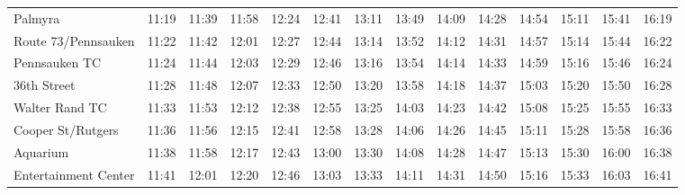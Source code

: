 \begin{center}
\begin{tabular}{@{}lrrrrrrrrrrrrr@{}}
Palmyra & 11:19 & 11:39 & 11:58 & 12:24 & 12:41 & 13:11 & 13:49 & 14:09 & 14:28 & 14:54 & 15:11 & 15:41 & 16:19 \\
Route 73/Pennsauken & 11:22 & 11:42 & 12:01 & 12:27 & 12:44 & 13:14 & 13:52 & 14:12 & 14:31 & 14:57 & 15:14 & 15:44 & 16:22 \\
Pennsauken TC & 11:24 & 11:44 & 12:03 & 12:29 & 12:46 & 13:16 & 13:54 & 14:14 & 14:33 & 14:59 & 15:16 & 15:46 & 16:24 \\
36th Street & 11:28 & 11:48 & 12:07 & 12:33 & 12:50 & 13:20 & 13:58 & 14:18 & 14:37 & 15:03 & 15:20 & 15:50 & 16:28 \\
Walter Rand TC & 11:33 & 11:53 & 12:12 & 12:38 & 12:55 & 13:25 & 14:03 & 14:23 & 14:42 & 15:08 & 15:25 & 15:55 & 16:33 \\
Cooper St/Rutgers & 11:36 & 11:56 & 12:15 & 12:41 & 12:58 & 13:28 & 14:06 & 14:26 & 14:45 & 15:11 & 15:28 & 15:58 & 16:36 \\
Aquarium & 11:38 & 11:58 & 12:17 & 12:43 & 13:00 & 13:30 & 14:08 & 14:28 & 14:47 & 15:13 & 15:30 & 16:00 & 16:38 \\
Entertainment Center & 11:41 & 12:01 & 12:20 & 12:46 & 13:03 & 13:33 & 14:11 & 14:31 & 14:50 & 15:16 & 15:33 & 16:03 & 16:41 \\
\bottomrule\end{tabular}\end{center}
